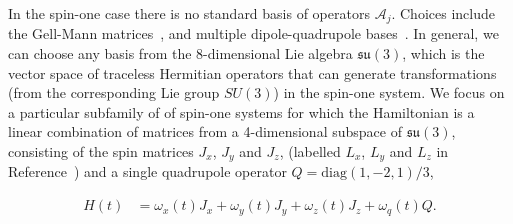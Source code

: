 \documentclass{jors}
\newcommand{\todo}[1]{\textcolor{green}{\texttt{[TODO: #1]}}}
\begin{document}
		In the spin-one case there is no standard basis of operators $ \mathcal{A}_j $.
		Choices include the Gell-Mann matrices~\cite{gell-mann_symmetries_1962}, and multiple dipole-quadrupole bases~\cite{hamley_spin-nematic_2012, di_dipolequadrupole_2010}.
		In general, we can choose any basis from the 8-dimensional Lie algebra $ \mathfrak{su}(3) $, which is the vector space of traceless Hermitian operators that can generate transformations (from the corresponding Lie group $ SU(3) $) in the spin-one system.
		We focus on a particular subfamily of of spin-one systems for which the Hamiltonian is a linear combination of matrices from a 4-dimensional subspace of $ \mathfrak{su}(3) $, consisting of the spin matrices $ J_x $, $ J_y $ and $ J_z $, (labelled $ L_x $, $ L_y $ and $ L_z $ in Reference~\cite{hamley_spin-nematic_2012}) and a single quadrupole operator $ Q = \mathrm{diag}(1, -2, 1)/3 $,%


		\begin{align}
			H(t) &= \omega_x(t) J_x + \omega_y(t) J_y + \omega_z(t) J_z + \omega_q(t) Q.
		\end{align}
		
\end{document}
